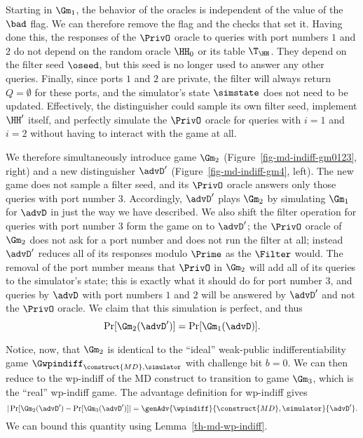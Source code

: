 	Starting in $\Gm_1$, the behavior of the oracles is independent of the value of the $\bad$ flag.
	We can therefore remove the flag and the checks that set it.
	Having done this, the responses of the $\PrivO$ oracle to queries with port numbers $1$ and $2$ do not depend on the random oracle $\HH_0$ or its table $\T_{\HH}$.
	They depend on the filter seed $\oseed$, but this seed is no longer used to answer any other queries. 
	Finally, since ports $1$ and $2$ are private, the filter will always return $Q = \emptyset$ for these ports, and the simulator's state $\simstate$ does not need to be updated.
	Effectively, the distinguisher could sample its own filter seed, implement $\HH^{\prime}$ itself, and perfectly simulate the $\PrivO$ oracle for queries with $i=1$ and $i=2$ without having to interact with the game at all. 
	
	We therefore simultaneously introduce game $\Gm_2$ (Figure~\ref{fig-md-indiff-gm0123}, right) and a new distinguisher $\advD^{\prime}$ (Figure~\ref{fig-md-indiff-gm4}, left).
	The new game does not sample a filter seed, and its $\PrivO$ oracle answers only those queries with port number $3$.
	Accordingly, $\advD^{\prime}$ plays $\Gm_2$ by simulating $\Gm_1$ for $\advD$ in just the way we have described.
	We also shift the filter operation for queries with port number $3$ form the game on to $\advD^{\prime}$; the $\PrivO$ oracle of $\Gm_2$ does not ask for a port number and does not run the filter at all; instead $\advD^{\prime}$ reduces all of its responses modulo $\Prime$ as the $\Filter$ would.
	The removal of the port number means that $\PrivO$ in $\Gm_2$ will add all of its queries to the simulator's state; this is exactly what it should do for port number $3$, and queries by $\advD$ with port numbers $1$ and $2$ will be answered by $\advD^{\prime}$ and not the $\PrivO$ oracle. 
	We claim that this simulation is perfect, and thus 
	\[ \Pr[\Gm_2(\advD^{\prime})] = \Pr[\Gm_1(\advD)] .\]
	
	Notice, now, that $\Gm_2$ is identical to the ``ideal'' weak-public indifferentiability game $\Gwpindiff_{\construct{MD},  \simulator}$ with challenge bit $b = 0$. 
	We can then reduce to the wp-indiff of the MD construct to transition to game $\Gm_3$, which is the ``real'' wp-indiff game.
	The advantage definition for wp-indiff gives
	\[|\Pr[\Gm_2(\advD^{\prime}) - \Pr[\Gm_3(\advD^{\prime})] |= \genAdv{\wpindiff}{\construct{MD},\simulator}{\advD^{\prime}}. \]
	We can bound this quantity using Lemma~\ref{th-md-wp-indiff}.
	
